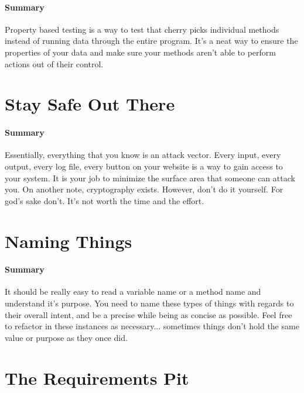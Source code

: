\documentclass{article}
\begin{document}
    \paragraph{Summary} Property based testing is a way to test that cherry picks individual methods instead of running data through the entire program. It's a neat way to ensure the properties of your data and make sure your methods aren't able to perform actions out of their control. 

\section{Stay Safe Out There}
    \paragraph{Summary} Essentially, everything that you know is an attack vector. Every input, every output, every log file, every button on your website is a way to gain access to your system. It is your job to minimize the surface area that someone can attack you. On another note, cryptography exists. However, don't do it yourself. For god's sake don't. It's not worth the time and the effort.

\section{Naming Things}
    \paragraph{Summary} It should be really easy to read a variable name or a method name and understand it's purpose. You need to name these types of things with regards to their overall intent, and be a precise while being as concise as possible. Feel free to refactor in these instances as necessary... sometimes things don't hold the same value or purpose as they once did.

\section{The Requirements Pit}
\end{document}
